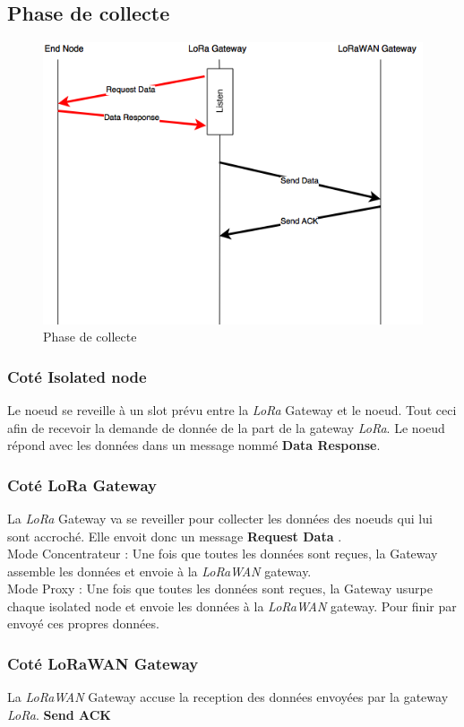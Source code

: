 \subsection{Phase de collecte}
\begin{figure}[!ht]
\centering
\includegraphics[scale=0.6]{Collect.png} 
\caption{Phase de collecte}
\end{figure}

\subsubsection{Coté Isolated node} Le noeud se reveille à un slot prévu entre la \textit{LoRa} Gateway et le noeud. Tout ceci afin de recevoir la demande de donnée de la part de la gateway \textit{LoRa}. Le noeud répond avec les données dans un message nommé  \textbf{Data Response}.
\subsubsection{Coté LoRa Gateway}
La \textit{LoRa} Gateway va se reveiller pour collecter les données des noeuds qui lui sont accroché. Elle envoit donc un message  \textbf{Request Data} . \\
Mode Concentrateur : Une fois que toutes les données sont reçues, la Gateway assemble les données et envoie à la  \textit{LoRaWAN} gateway. \\
Mode Proxy : Une fois que toutes les données sont reçues, la Gateway usurpe chaque isolated node et envoie les données à la  \textit{LoRaWAN} gateway. Pour finir par envoyé ces propres données.
\subsubsection{Coté LoRaWAN Gateway}
La \textit{LoRaWAN} Gateway accuse la reception des données envoyées par la gateway \textit{LoRa}.
\textbf{Send ACK}
